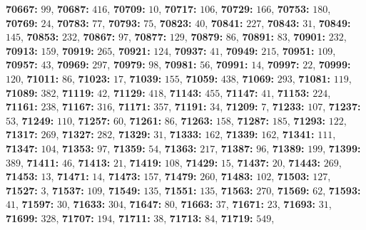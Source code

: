 \textsf{\bfseries 70667:} $99$, \textsf{\bfseries 70687:} $416$, \textsf{\bfseries 70709:} $10$, \textsf{\bfseries 70717:} $106$, \textsf{\bfseries 70729:} $166$, \textsf{\bfseries 70753:} $180$, \textsf{\bfseries 70769:} $24$, \textsf{\bfseries 70783:} $77$, \textsf{\bfseries 70793:} $75$, \textsf{\bfseries 70823:} $40$, \textsf{\bfseries 70841:} $227$, \textsf{\bfseries 70843:} $31$, \textsf{\bfseries 70849:} $145$, \textsf{\bfseries 70853:} $232$, \textsf{\bfseries 70867:} $97$, \textsf{\bfseries 70877:} $129$, \textsf{\bfseries 70879:} $86$, \textsf{\bfseries 70891:} $83$, \textsf{\bfseries 70901:} $232$, \textsf{\bfseries 70913:} $159$, \textsf{\bfseries 70919:} $265$, \textsf{\bfseries 70921:} $124$, \textsf{\bfseries 70937:} $41$, \textsf{\bfseries 70949:} $215$, \textsf{\bfseries 70951:} $109$, \textsf{\bfseries 70957:} $43$, \textsf{\bfseries 70969:} $297$, \textsf{\bfseries 70979:} $98$, \textsf{\bfseries 70981:} $56$, \textsf{\bfseries 70991:} $14$, \textsf{\bfseries 70997:} $22$, \textsf{\bfseries 70999:} $120$, \textsf{\bfseries 71011:} $86$, \textsf{\bfseries 71023:} $17$, \textsf{\bfseries 71039:} $155$, \textsf{\bfseries 71059:} $438$, \textsf{\bfseries 71069:} $293$, \textsf{\bfseries 71081:} $119$, \textsf{\bfseries 71089:} $382$, \textsf{\bfseries 71119:} $42$, \textsf{\bfseries 71129:} $418$, \textsf{\bfseries 71143:} $455$, \textsf{\bfseries 71147:} $41$, \textsf{\bfseries 71153:} $224$, \textsf{\bfseries 71161:} $238$, \textsf{\bfseries 71167:} $316$, \textsf{\bfseries 71171:} $357$, \textsf{\bfseries 71191:} $34$, \textsf{\bfseries 71209:} $7$, \textsf{\bfseries 71233:} $107$, \textsf{\bfseries 71237:} $53$, \textsf{\bfseries 71249:} $110$, \textsf{\bfseries 71257:} $60$, \textsf{\bfseries 71261:} $86$, \textsf{\bfseries 71263:} $158$, \textsf{\bfseries 71287:} $185$, \textsf{\bfseries 71293:} $122$, \textsf{\bfseries 71317:} $269$, \textsf{\bfseries 71327:} $282$, \textsf{\bfseries 71329:} $31$, \textsf{\bfseries 71333:} $162$, \textsf{\bfseries 71339:} $162$, \textsf{\bfseries 71341:} $111$, \textsf{\bfseries 71347:} $104$, \textsf{\bfseries 71353:} $97$, \textsf{\bfseries 71359:} $54$, \textsf{\bfseries 71363:} $217$, \textsf{\bfseries 71387:} $96$, \textsf{\bfseries 71389:} $199$, \textsf{\bfseries 71399:} $389$, \textsf{\bfseries 71411:} $46$, \textsf{\bfseries 71413:} $21$, \textsf{\bfseries 71419:} $108$, \textsf{\bfseries 71429:} $15$, \textsf{\bfseries 71437:} $20$, \textsf{\bfseries 71443:} $269$, \textsf{\bfseries 71453:} $13$, \textsf{\bfseries 71471:} $14$, \textsf{\bfseries 71473:} $157$, \textsf{\bfseries 71479:} $260$, \textsf{\bfseries 71483:} $102$, \textsf{\bfseries 71503:} $127$, \textsf{\bfseries 71527:} $3$, \textsf{\bfseries 71537:} $109$, \textsf{\bfseries 71549:} $135$, \textsf{\bfseries 71551:} $135$, \textsf{\bfseries 71563:} $270$, \textsf{\bfseries 71569:} $62$, \textsf{\bfseries 71593:} $41$, \textsf{\bfseries 71597:} $30$, \textsf{\bfseries 71633:} $304$, \textsf{\bfseries 71647:} $80$, \textsf{\bfseries 71663:} $37$, \textsf{\bfseries 71671:} $23$, \textsf{\bfseries 71693:} $31$, \textsf{\bfseries 71699:} $328$, \textsf{\bfseries 71707:} $194$, \textsf{\bfseries 71711:} $38$, \textsf{\bfseries 71713:} $84$, \textsf{\bfseries 71719:} $549$, 
